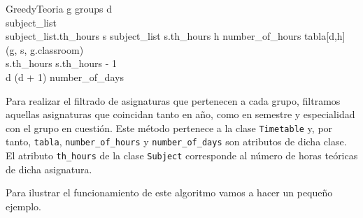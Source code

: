 \begin{pseudocode}{GreedyTeoria}{ }
    \label{greedyteoria}
    \FOREACH g \in groups \DO
    \BEGIN
        d  \\
        subject\_list \GETS {}\\
        \WHILE \sum subject\_list.th\_hours  \DO
        \BEGIN
            \FOREACH s \in subject_list \DO
            \BEGIN
                \IF s.th\_hours  \DO
                \BEGIN
                    \FOR h  \TO number\_of\_hours \DO
                    \BEGIN
                        \IF {} \DO
                        \BEGIN
                            tabla[d,h] \GETS (g, s, g.classroom)\\
                            s.th\_hours \GETS s.th\_hours - 1\\
                            d \GETS (d + 1) \bmod number\_of\_days\\
                            \BREAK
                        \END
                    \END
                \END
            \END
        \END
    \END
\end{pseudocode}

Para realizar el filtrado de asignaturas que pertenecen a cada grupo, filtramos aquellas asignaturas que coincidan tanto en año, como en semestre y especialidad con el grupo en cuestión. Este método pertenece a la clase \texttt{Timetable} y, por tanto, \texttt{tabla}, \texttt{number\_of\_hours} y \texttt{number\_of\_days} son atributos de dicha clase. El atributo \texttt{th\_hours} de la clase \texttt{Subject} corresponde al número de horas teóricas de dicha asignatura.

Para ilustrar el funcionamiento de este algoritmo vamos a hacer un pequeño ejemplo.
